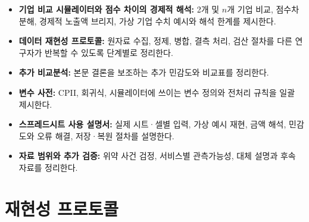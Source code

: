 \documentclass[11pt,a4paper]{report}
\begin{document}
\begin{itemize}[leftmargin=2.2em]
  \item \textbf{기업 비교 시뮬레이터와 점수 차이의 경제적 해석:} 2개 및 $n$개 기업 비교, 점수차 분해, 경제적 노출액 브리지, 가상 기업 수치 예시와 해석 한계를 제시한다.
  \item \textbf{데이터 재현성 프로토콜:} 원자료 수집, 정제, 병합, 결측 처리, 검산 절차를 다른 연구자가 반복할 수 있도록 단계별로 정리한다.
  \item \textbf{추가 비교분석:} 본문 결론을 보조하는 추가 민감도와 비교표를 정리한다.
  \item \textbf{변수 사전:} CPII, 회귀식, 시뮬레이터에 쓰이는 변수 정의와 전처리 규칙을 일괄 제시한다.
  \item \textbf{스프레드시트 사용 설명서:} 실제 시트·셀별 입력, 가상 예시 재현, 금액 해석, 민감도와 오류 해결, 저장·복원 절차를 설명한다.
  \item \textbf{자료 범위와 추가 검증:} 위약 사건 검정, 서비스별 관측가능성, 대체 설명과 후속 자료를 정리한다.
\end{itemize}



\chapter{재현성 프로토콜}
\end{document}
